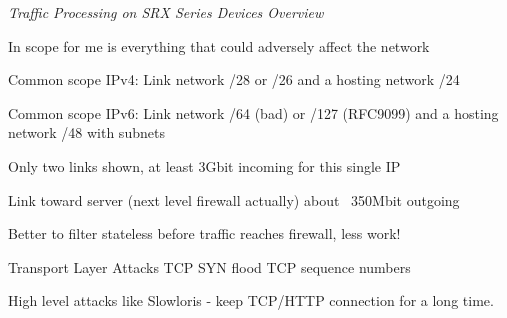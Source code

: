 \documentclass[Screen16to9,17pt]{foils}
\begin{document}

\emph{Traffic Processing on SRX Series Devices Overview}\\ {\scriptsize
{}}







\begin{list2}
\item In scope for me is everything that could adversely affect the network
\item Common scope IPv4: Link network /28 or /26 and a hosting network /24
\item Common scope IPv6: Link network /64 (bad) or /127 (RFC9099) and a hosting network /48 with subnets
\end{list2}



\centerline{Only two links shown, at least 3Gbit incoming for this single IP}

\centerline{Link toward server (next level firewall actually) about ~350Mbit outgoing}

Better to filter stateless before traffic reaches firewall, less work!





\begin{list2}
\item Transport Layer Attacks TCP SYN flood TCP sequence numbers
\item High level attacks like Slowloris - keep TCP/HTTP connection for a long time.
\end{list2}
\end{document}
